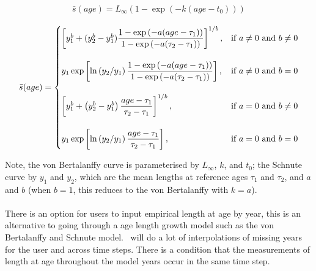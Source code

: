 \paragraph[von Bertalanffy]{}
\begin{equation} 
\bar{s}(age)= L_\infty \left( 1 - \exp \left( -k \left(age-t_0 \right) \right) \right)
\end{equation}

\paragraph[Schnute]{}
\begin{equation}
\bar{s}(age)=\displaystyle\begin{cases}
  \left[ y_1^b + (y_2^b - y_1^b) \dfrac{1-\exp \left(-a(age - \tau_1) \right)}{1-\exp \left(-a(\tau_2 - \tau_1) \right)} \right]^{1/b}, & \text{if $a\ne0$ and $b\ne0$} \\
  \AddVspace
  y_1 \exp \left[ \ln \left( y_2 / y_1 \right) \dfrac{1-\exp \left(-a(age - \tau_1) \right)}{1-\exp \left(-a(\tau_2 - \tau_1) \right)} \right], & \text{if $a\ne0$ and $b=0$} \\
  \AddVspace
  \left[ y_1^b + \left( y_2^b - y_1^b \right) \dfrac{age-\tau_1}{\tau_2 - \tau_1} \right]^{1/b}, & \text{if $a=0$ and $b\ne0$} \\
  \AddVspace
  y_1 \exp \left[ \ln \left( y_2/y_1 \right) \dfrac{age-\tau_1}{\tau_2 - \tau_1} \right] , & \text{if $a=0$ and $b=0$} \\
  \end{cases}
\end{equation}

Note, the von Bertalanffy curve is parameterised by $L_\infty$, $k$, and $t_0$; the Schnute curve \citep{836} by $y_1$ and $y_2$, which are the mean lengths at reference ages $\tau_1$ and $\tau_2$, and $a$ and $b$ (when $b=1$, this reduces to the von Bertalanffy with $k=a$). 

\paragraph[Data]{}
There is an option for users to input empirical length at age by year, this is an alternative to going through a age length growth model such as the von Bertalanffy and Schnute model. \CNAME\ will do a lot of interpolations of missing years for the user and across time steps. There is a condition that the measurements of length at age throughout the model years occur in the same time step.

